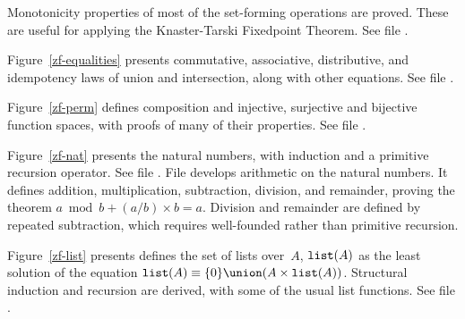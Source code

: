 Monotonicity properties of most of the set-forming operations are proved.
These are useful for applying the Knaster-Tarski Fixedpoint Theorem.
See file .

Figure~\ref{zf-equalities} presents commutative, associative, distributive,
and idempotency laws of union and intersection, along with other equations.
See file .

Figure~\ref{zf-perm} defines composition and injective, surjective and
bijective function spaces, with proofs of many of their properties.
See file .

Figure~\ref{zf-nat} presents the natural numbers, with induction and a
primitive recursion operator.  See file .  File
 develops arithmetic on the natural numbers.  It
defines addition, multiplication, subtraction, division, and remainder,
proving the theorem $a \bmod b + (a/b)\times b = a$.  Division and
remainder are defined by repeated subtraction, which requires well-founded
rather than primitive recursion.

Figure~\ref{zf-list} presents defines the set of lists over~$A$, ${\tt
list}(A)$ as the least solution of the equation ${\tt list}(A)\equiv \{0\}
\union (A\times{\tt list}(A))$.  Structural induction and recursion are
derived, with some of the usual list functions.  See file
.

